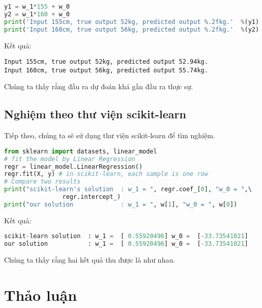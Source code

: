 \begin{lstlisting}[language=Python]
y1 = w_1*155 + w_0
y2 = w_1*160 + w_0
print('Input 155cm, true output 52kg, predicted output %.2fkg.'  %(y1) )
print('Input 160cm, true output 56kg, predicted output %.2fkg.'  %(y2) )
\end{lstlisting}
Kết quả:
\begin{lstlisting}
Input 155cm, true output 52kg, predicted output 52.94kg.
Input 160cm, true output 56kg, predicted output 55.74kg.
\end{lstlisting}

Chúng ta thấy rằng đầu ra dự đoán khá gần đầu ra thực sự.


\subsection{Nghiệm theo thư viện scikit-learn}

Tiếp theo, chúng ta sẽ sử dụng thư viện scikit-learn để tìm nghiệm.

\begin{lstlisting}[language=Python]
from sklearn import datasets, linear_model
# fit the model by Linear Regression
regr = linear_model.LinearRegression() 
regr.fit(X, y) # in scikit-learn, each sample is one row 
# Compare two results
print("scikit-learn's solution  : w_1 = ", regr.coef_[0], "w_0 = ",\        
                regr.intercept_)
print("our solution             : w_1 = ", w[1], "w_0 = ", w[0])
\end{lstlisting}
Kết quả: 
\begin{lstlisting}[language=Python]
scikit-learn solution  : w_1 =  [ 0.55920496] w_0 =  [-33.73541021]
our solution           : w_1 =  [ 0.55920496] w_0 =  [-33.73541021]
\end{lstlisting}

Chúng ta thấy rằng hai kết quả thu được là như nhau.


\section{Thảo luận}


